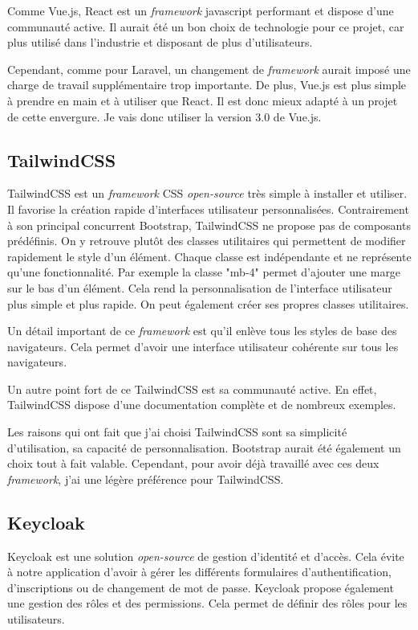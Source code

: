 Comme Vue.js, React est un \emph{framework} javascript performant et dispose d'une communauté active. Il aurait été un bon choix de technologie pour ce projet, car plus utilisé dans l'industrie et disposant de plus d'utilisateurs.

Cependant, comme pour Laravel, un changement de \emph{framework} aurait imposé une charge de travail supplémentaire trop importante. De plus, Vue.js est plus simple à prendre en main et à utiliser que React. Il est donc mieux adapté à un projet de cette envergure. Je vais donc utiliser la version 3.0 de Vue.js.

\subsection{TailwindCSS}
TailwindCSS \cite{TailwindCSS} est un \emph{framework} CSS \emph{open-source} très simple à installer et utiliser. Il favorise la création rapide d'interfaces utilisateur personnalisées. Contrairement à son principal concurrent Bootstrap, TailwindCSS ne propose pas de composants prédéfinis. On y retrouve plutôt des classes utilitaires qui permettent de modifier rapidement le style d'un élément. Chaque classe est indépendante et ne représente qu'une fonctionnalité. Par exemple la classe "mb-4" permet d'ajouter une marge sur le bas d'un élément. Cela rend la personnalisation de l'interface utilisateur plus simple et plus rapide. On peut également créer ses propres classes utilitaires.

Un détail important de ce \emph{framework} est qu'il enlève tous les styles de base des navigateurs. Cela permet d'avoir une interface utilisateur cohérente sur tous les navigateurs.

Un autre point fort de ce TailwindCSS est sa communauté active. En effet, TailwindCSS dispose d'une documentation complète et de nombreux exemples.

Les raisons qui ont fait que j'ai choisi TailwindCSS sont sa simplicité d'utilisation, sa capacité de personnalisation. Bootstrap aurait été également un choix tout à fait valable. Cependant, pour avoir déjà travaillé avec ces deux \emph{framework}, j'ai une légère préférence pour TailwindCSS.

\subsection{Keycloak}
Keycloak \cite{Keycloak} est une solution \emph{open-source} de gestion d'identité et d'accès. Cela évite à notre application d'avoir à gérer les différents formulaires d'authentification, d'inscriptions ou de changement de mot de passe. Keycloak propose également une gestion des rôles et des permissions. Cela permet de définir des rôles pour les utilisateurs.

